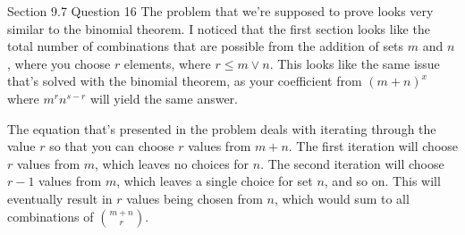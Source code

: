 \documentclass[12pt]{article}
\begin{document}
  \begin{problem}{Section 9.7 Question 16}
    The problem that we're supposed to prove looks very similar to the binomial theorem. I
    noticed that the first section looks like the total number of combinations that are
    possible from the addition of sets $m$ and $n$, where you choose $r$ elements, where
    $r \leq m \vee n$. This looks like the same issue that's solved with the binomial theorem,
    as your coefficient from $(m + n)^{x}$ where $m^{r} n^{s-r}$ will yield the same answer.
 
    The equation that's presented in the problem deals with iterating through the value $r$ so
    that you can choose $r$ values from $m + n$. The first iteration will choose $r$ values from
    $m$, which leaves no choices for $n$. The second iteration will choose $r-1$ values from
    $m$, which leaves a single choice for set $n$, and so on. This will eventually result in
    $r$ values being chosen from $n$, which would sum to all combinations of $\binom{m+n}{r}$.
  \end{problem}
\end{document}
